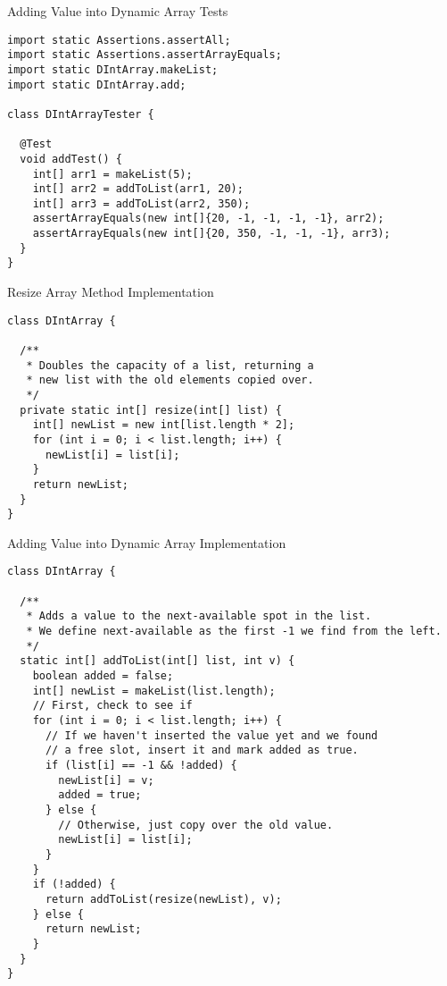 \begin{cl}{Adding Value into Dynamic Array Tests}
\begin{lstlisting}[language=MyJava]
import static Assertions.assertAll;
import static Assertions.assertArrayEquals;
import static DIntArray.makeList;
import static DIntArray.add;

class DIntArrayTester {

  @Test
  void addTest() {
    int[] arr1 = makeList(5);
    int[] arr2 = addToList(arr1, 20);
    int[] arr3 = addToList(arr2, 350);
    assertArrayEquals(new int[]{20, -1, -1, -1, -1}, arr2);
    assertArrayEquals(new int[]{20, 350, -1, -1, -1}, arr3);
  }
}
\end{lstlisting}
\end{cl}

\begin{cl}{Resize Array Method Implementation}
\begin{lstlisting}[language=MyJava]
class DIntArray {

  /**
   * Doubles the capacity of a list, returning a 
   * new list with the old elements copied over.
   */
  private static int[] resize(int[] list) {
    int[] newList = new int[list.length * 2];
    for (int i = 0; i < list.length; i++) {
      newList[i] = list[i];
    }
    return newList;
  }
}
\end{lstlisting}
\end{cl}

\begin{cl}{Adding Value into Dynamic Array Implementation}
\begin{lstlisting}[language=MyJava]
class DIntArray {

  /**
   * Adds a value to the next-available spot in the list.
   * We define next-available as the first -1 we find from the left.
   */
  static int[] addToList(int[] list, int v) {
    boolean added = false;
    int[] newList = makeList(list.length);
    // First, check to see if 
    for (int i = 0; i < list.length; i++) {
      // If we haven't inserted the value yet and we found
      // a free slot, insert it and mark added as true.
      if (list[i] == -1 && !added) {
        newList[i] = v;
        added = true;
      } else {
        // Otherwise, just copy over the old value.
        newList[i] = list[i];
      }
    }
    if (!added) {
      return addToList(resize(newList), v);
    } else {
      return newList;
    }
  }
}
\end{lstlisting}
\end{cl}

